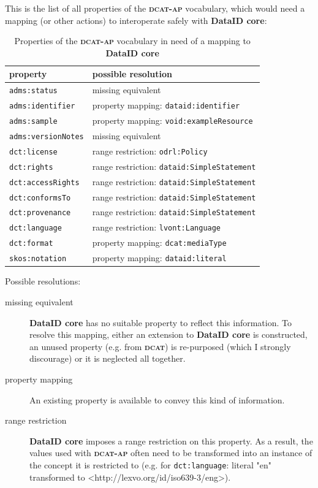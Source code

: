 \documentclass[a4paper,english,twoside,BCOR1.5cm,headsepline,DIV12,appendixprefix,final,12pt]{scrbook}
\newcommand{\core}{{\ttfamily\bfseries DataID core}\xspace}
\newcommand{\dcat}{{\scshape\bfseries dcat}\xspace}
\newcommand{\dcatap}{{\scshape\bfseries dcat-ap}\xspace}
\newcommand{\prop}[1]{{{\texttt{#1}}}}
\begin{document}
This is the list of all properties of the \dcatap vocabulary, which would need a mapping (or other actions) to interoperate safely with \core:

\begin{table}[!htbp]
    \centering
    \begin{tabular}{|l|l|}
        \hline
        property & possible resolution \\
        \hline
        \prop{adms:status} & missing equivalent\\
        \prop{adms:identifier} & property mapping: \prop{dataid:identifier}\\
        \prop{adms:sample} & property mapping: \prop{void:exampleResource}\\
        \prop{adms:versionNotes} & missing equivalent\\
        \prop{dct:license} & range restriction: \prop{odrl:Policy}\\
        \prop{dct:rights} & range restriction: \prop{dataid:SimpleStatement}\\
        \prop{dct:accessRights} & range restriction: \prop{dataid:SimpleStatement}\\
        \prop{dct:conformsTo} & range restriction: \prop{dataid:SimpleStatement}\\
        \prop{dct:provenance} & range restriction: \prop{dataid:SimpleStatement}\\
        \prop{dct:language} & range restriction: \prop{lvont:Language}\\
        \prop{dct:format} & property mapping: \prop{dcat:mediaType}\\
        \prop{skos:notation} & property mapping: \prop{dataid:literal}\\
        \hline
    \end{tabular}
    \caption{Properties of the \dcatap vocabulary in need of a mapping to \core}
    \label{tab:dcatapmapping}
\end{table}

Possible resolutions:
\begin{description}
\item[missing equivalent] \core has no suitable property to reflect this information. To resolve this mapping, either an extension to \core is constructed, an unused property (e.g. from \dcat) is re-purposed (which I strongly discourage) or it is neglected all together.
\item[property mapping] An existing property is available to convey this kind of information.
\item[range restriction] \core imposes a range restriction on this property. As a result, the values used with \dcatap often need to be transformed into an instance of the concept it is restricted to (e.g. for \prop{dct:language}: literal "en" transformed to <http://lexvo.org/id/iso639-3/eng>).
\end{description}
\end{document}
